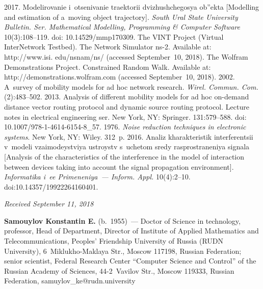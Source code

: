 \begin{multicols}{2}
{{\begin{thebibliography}{99}
 2017. Modelirovanie i~otsenivanie traektorii dvizhushchegosya ob''ekta 
[Modelling and estimation of a~moving object trajectory]. 
\textit{South Ural State University Bulletin. Ser. Mathematical Modelling, 
Programming \& Computer Software} 10(3):108--119. doi: 10.14529/mmp170309.
The VINT Project (Virtual InterNetwork Testbed). The Network Simulator ns-2. Available 
at: {\sf http://www.isi. edu/nsnam/ns/} (accessed September~10, 2018).
The Wolfram Demonstrations Project. Constrained Random Walk. Available at: {\sf 
http://demonstrations.wolfram.\linebreak com} (accessed September~10, 2018).
 2002. A~survey of mobility models for ad hoc 
network research. \textit{Wirel. Commun. Com.} (2):483--502.
 2013. Analysis of different 
mobility models for ad hoc on-demand distance vector routing protocol and dynamic 
source routing protocol. {Lecture notes in electrical engineering ser.} New York, NY: 
Springer. 131:579--588. doi: 10.1007/978-1-4614-6154-8\_57. 
 1976. \textit{Noise reduction techniques 
in electronic systems}. 
New York, NY: Wiley. 312~p.
 2016. Analiz kharakteristik interferentsii v~modeli vzaimodeystviya 
ustroystv s~uche\-tom sredy rasprostraneniya signala [Analysis of the characteristics of the 
interference in the model of interaction between devices taking into account the signal 
propagation environment]. \textit{Informatika i~ee Primeneniya~--- Inform. Appl.}  
10(4):2--10. doi:10.14357/19922264160401.
\end{thebibliography}

 }
 }

\end{multicols}

\vspace*{-6pt}

\hfill{\small\textit{Received September 11, 2018}}


\vspace*{-18pt}

\Contr

\noindent
\textbf{Samouylov Konstantin E.} (b.\ 1955)~--- Doctor of Science in technology, professor, Head of Department, Director 
of Institute of Applied Mathematics and Telecommunications, Peoples' Friendship University of Russia (RUDN University), 
6~Miklukho-Maklaya Str., Moscow 117198, Russian Federation; senior scientist, Federal Research Center 
``Computer Science and Control'' of the Russian Academy of Sciences, 44-2~Vavilov Str., Moscow 119333, Russian Federation, 
\mbox{samuylov\_ke@rudn.university}

